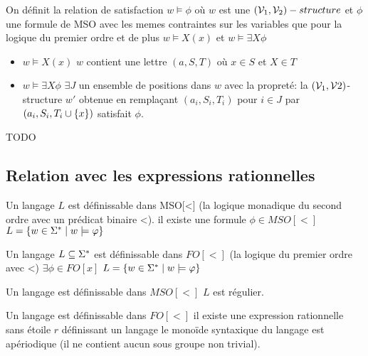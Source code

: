\begin{definition}
	On définit la relation de satisfaction $w \models \phi$ où $w$ est une $(\mathcal{V}_1, \mathcal{V}_2)-structure$ et $\phi$ une formule de
	MSO avec les memes contraintes sur les variables que pour la logique du premier ordre %
	et de plus $w \models X(x)$ et $w \models \exists X \phi$
\end{definition}




\begin{itemize}
	\item $w \models X (x)$ \ssi $w$ contient une lettre $(a,S,T)$ où $x \in S$ et $X \in T$
	\item $w \models \exists X \phi$ \ssi $\exists J$ un ensemble de positions dans $w$ avec la propreté:
	      la $(\mathcal{V}_1, \mathcal{V}2)$-structure $w'$ obtenue en remplaçant $(a_i, S_i,T_i)$ pour $i \in J$ par $(a_i, S_i, T_i \cup \left\{x\right\})$ satisfait $\phi$.
\end{itemize}


\begin{exemple}
	TODO
\end{exemple}


\subsection{Relation avec les expressions rationnelles}


\begin{definition}
	Un langage $L$ est définissable dans MSO[<] (la logique monadique du second ordre avec un prédicat binaire <).
	\ssi il existe une formule $\phi \in MSO[<]$ \tlq $L = \left\{w\in \Sigma^{*} \mid w \models \varphi\right\}$
\end{definition}

\begin{definition}
	Un langage $L \subseteq \Sigma^{*}$ est définissable dans $FO[<]$ (la logique du premier ordre avec <)
	\ssi $\exists \phi \in FO[x]$ \tlq $L = \left\{w \in \Sigma^{*} \mid w \models \varphi\right\}$
\end{definition}

\begin{theorem}
	Un langage est définissable dans $MSO[<]$ \ssi $L$ est régulier.
\end{theorem}


\begin{theorem}
	Un langage est définissable dans $FO[<]$ \ssi il existe une expression rationnelle sans étoile $r$ définissant un langage
	\ssi
	le monoïde syntaxique du langage est apériodique (\cad il ne contient aucun sous groupe non trivial).
\end{theorem}



